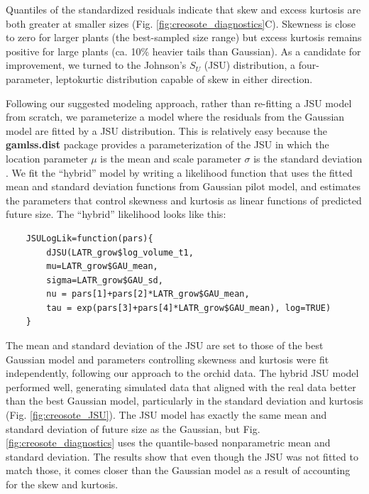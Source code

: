 \documentclass[12pt]{article}
\begin{document}
\begin{spacing}{1.35}
 
Quantiles of the standardized residuals indicate that skew and excess kurtosis are both greater at smaller sizes (Fig. \ref{fig:creosote_diagnostics}C).
Skewness is close to zero for larger plants (the best-sampled size range) but excess kurtosis remains positive for large plants (ca. 10\% heavier tails than Gaussian). 
As a candidate for improvement, we turned to the Johnson's $S_{U}$ (JSU) distribution, a four-parameter, leptokurtic distribution capable of skew in either direction. 

Following our suggested modeling approach, rather than re-fitting a JSU model from scratch, we parameterize a model where the residuals from the Gaussian model are fitted by a JSU distribution. 
This is relatively easy because the \textbf{gamlss.dist} package provides a parameterization of the JSU in which the location parameter $\mu$ is the mean and scale parameter $\sigma$ is the standard deviation \citep{rigby2019distributions}. 
We fit the ``hybrid'' model by writing a likelihood function that uses the fitted mean and standard deviation functions from Gaussian pilot model, and estimates the parameters that control skewness and kurtosis as linear functions of predicted future size.   
The ``hybrid'' likelihood looks like this:
\begin{lstlisting}
	JSULogLik=function(pars){
		dJSU(LATR_grow$log_volume_t1, 
		mu=LATR_grow$GAU_mean,
		sigma=LATR_grow$GAU_sd,
		nu = pars[1]+pars[2]*LATR_grow$GAU_mean,
		tau = exp(pars[3]+pars[4]*LATR_grow$GAU_mean), log=TRUE)
	}
\end{lstlisting}

The mean and standard deviation of the JSU are set to those of the best Gaussian model and parameters controlling skewness and kurtosis were fit independently, following our approach to the orchid data. 
The hybrid JSU model performed well, generating simulated data that aligned with the real data better than the best Gaussian model, particularly in the standard deviation and kurtosis (Fig. \ref{fig:creosote_JSU}). 
The JSU model has exactly the same mean and standard deviation of future size as the Gaussian, but Fig. \ref{fig:creosote_diagnostics} uses the quantile-based nonparametric mean and standard deviation. 
The results show that even though the JSU was not fitted to match those, it comes closer than the Gaussian model as a result of accounting for the skew and kurtosis.


\end{spacing}
\end{document}
